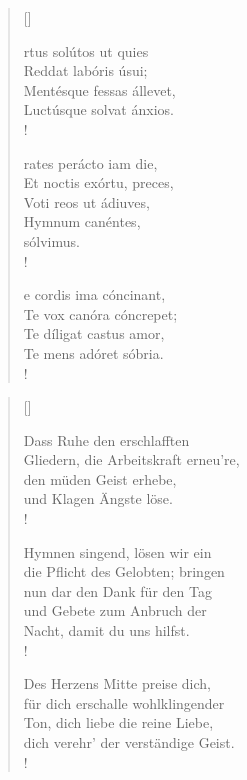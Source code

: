 {\setlength{\columnsep}{1cm}
\begin{multicols}{2} 
\begin{verse}[\versewidth]
 
{\small{
rtus solútos ut quies\\
Reddat labóris úsui;\\
Mentésque fessas állevet,\\
Luctúsque solvat ánxios.\\!

rates perácto iam die,\\
Et noctis exórtu, preces,\\ 
Voti reos ut ádiuves,\\ 
Hymnum canéntes,\\
sólvimus.\\!

e cordis ima cóncinant, \\
Te vox canóra cóncrepet; \\
Te díligat castus amor, \\
Te mens adóret sóbria. \\!}}
\end{verse}

\columnbreak

\begin{verse}[\versewidth]
 
{\small\rm{ Dass Ruhe den erschlafften\\
Gliedern, die Arbeitskraft erneu're,\\
den müden Geist erhebe,\\
und Klagen Ängste löse.\\!

 Hymnen singend, lösen wir ein\\
die Pflicht des Gelobten; bringen\\
nun dar den Dank für den Tag\\
und Gebete zum Anbruch der\\
Nacht, damit du uns hilfst.\\!

 Des Herzens Mitte preise dich,\\
für dich erschalle wohlklingender\\
Ton, dich liebe die reine Liebe,\\
dich verehr' der verständige Geist.\\!}}
\end{verse}
\end{multicols}
}


